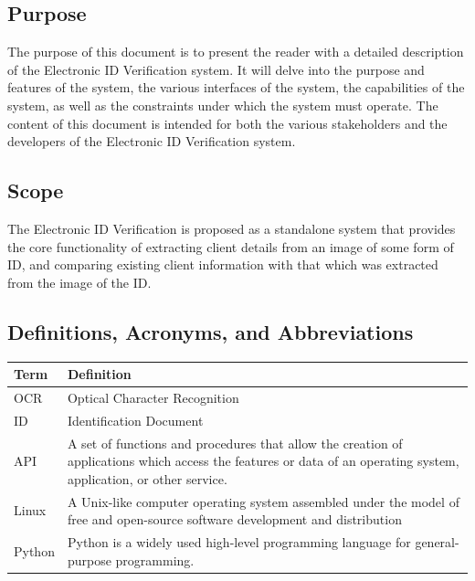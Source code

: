 \documentclass{article}
\def \project{Electronic ID Verification }
\begin{document}
		\subsection{Purpose}\label{subsec:purpose}
			The purpose of this document is to present the reader with a detailed description of the \project system. It will delve into the purpose and features of the system, the various interfaces of the system, the capabilities of the system, as well as the constraints under which the system must operate. The content of this document is intended for both the various stakeholders and the developers of the \project system.

		\subsection{Scope}\label{subsec:scope}
			The \project is proposed as a standalone system that provides the core functionality of extracting client details from an image of some form of ID, and comparing existing client information with that which was extracted from the image of the ID.

		\subsection{Definitions, Acronyms, and Abbreviations}\label{subsec:daa}
			\begin{table}[h!]
				\centering
				\label{tab: Table 1}
				\begin{tabular}{| m{4cm} | m{12cm} |}
					\hline
                        \textbf{Term} & \textbf{Definition}\\
					\hline
				    	OCR & Optical Character Recognition\\
				    \hline
			            ID & Identification Document\\
					
				    \hline
				        API & A set of functions and procedures that allow the creation of applications which access the features or data of an operating system, application, or other service. \\
				    \hline
				        Linux &  A Unix-like computer operating system assembled under the model of free and open-source software development and distribution\\
					\hline
					    Python & Python is a widely used high-level programming language for general-purpose programming.\\
					\hline
                    
				\end{tabular}
			\end{table}
		    
\end{document}
